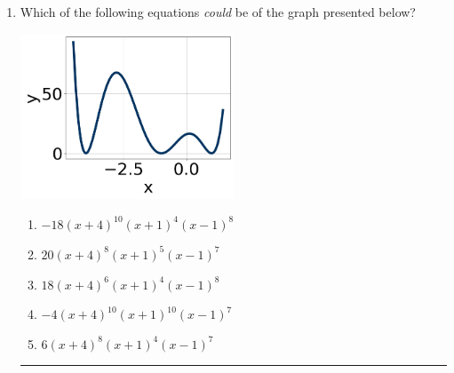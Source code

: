 \documentclass[14pt]{extbook}
\newcommand{\litem}[1]{\item#1\hspace*{-1cm}\rule{\textwidth}{0.4pt}}
\begin{document}
\begin{enumerate}
{\begin{enumerate}[label=\Alph*.]
\end{enumerate} }
\litem{
Which of the following equations \textit{could} be of the graph presented below?
\begin{center}
    \includegraphics[width=0.5\textwidth]{../Figures/polyGraphToFunctionCopyC.png}
\end{center}
\begin{enumerate}[label=\Alph*.]
\item \( -18(x + 4)^{10} (x + 1)^{4} (x - 1)^{8} \)
\item \( 20(x + 4)^{8} (x + 1)^{5} (x - 1)^{7} \)
\item \( 18(x + 4)^{6} (x + 1)^{4} (x - 1)^{8} \)
\item \( -4(x + 4)^{10} (x + 1)^{10} (x - 1)^{7} \)
\item \( 6(x + 4)^{8} (x + 1)^{4} (x - 1)^{7} \)


\end{enumerate}}
\end{enumerate}
\end{document}

